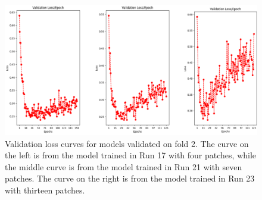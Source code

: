 \begin{figure}
	\centering
	\includegraphics[width=1.0\linewidth]{figures/ValidationLossesFourSevenThirteenPatches.png}
	\caption{Validation loss curves for models validated on fold 2. The curve on the left is from the model trained in Run 17 with four patches, while the middle curve is from the model trained in Run 21 with seven patches. The curve on the right is from the model trained in Run 23 with thirteen patches.}
	\label{fig:ValidationLossesFourSevenThirteenPatches}
\end{figure}

